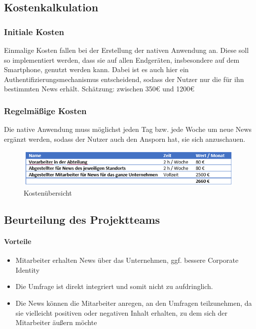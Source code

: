 \subsection{Kostenkalkulation}

\subsubsection{Initiale Kosten}

Einmalige Kosten fallen bei der Erstellung der nativen Anwendung an. Diese soll so implementiert werden, dass sie auf allen Endgeräten, insbesondere auf dem Smartphone, genutzt werden kann. Dabei ist es auch hier ein Authentifizierungsmechanismus entscheidend, sodass der Nutzer nur die für ihn bestimmten News erhält.
Schätzung: zwischen 350€ und 1200€

\subsubsection{Regelmäßige Kosten}

Die native Anwendung muss möglichst jeden Tag bzw. jede Woche um neue News ergänzt werden, sodass der Nutzer auch den Ansporn hat, sie sich anzuschauen.

\begin{figure}[H] 
\centering 
\includegraphics[scale=0.82]{images/5kosten} 
\caption[Kostenübersicht]{Kostenübersicht\protect} 
\label{ws} 
\end{figure}

\subsection{Beurteilung des Projektteams}

\paragraph{Vorteile}

\begin{itemize}
\item	Mitarbeiter erhalten News über das Unternehmen, ggf. bessere Corporate Identity
\item Die Umfrage ist direkt integriert und somit nicht zu aufdringlich.
\item Die News können die Mitarbeiter anregen, an den Umfragen teilzunehmen, da sie vielleicht positiven oder negativen Inhalt erhalten, zu dem sich der Mitarbeiter äußern möchte
\end{itemize}

